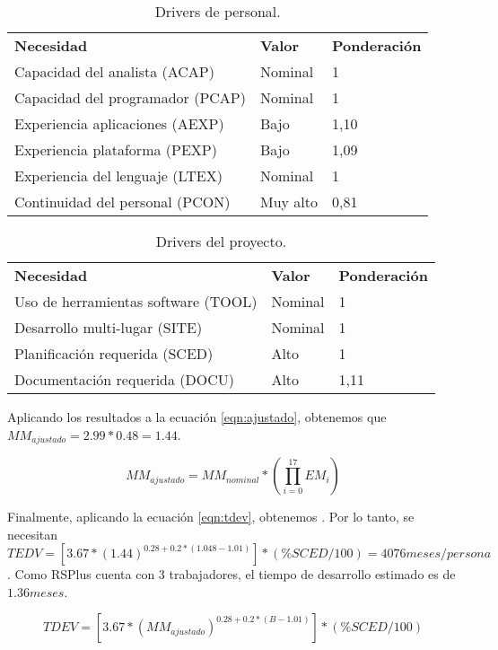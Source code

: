 \begin{table}[h]
\begin{center}
\begin{tabular}{ l l l }
\textbf{Necesidad} & \textbf{Valor} & \textbf{Ponderación} \\
Capacidad del analista (ACAP) &
Nominal &
1 \\
Capacidad del programador (PCAP) &
Nominal &
1 \\
Experiencia aplicaciones (AEXP) &
Bajo &
1,10 \\
Experiencia plataforma (PEXP) &
Bajo &
1,09 \\
Experiencia del lenguaje (LTEX) &
Nominal &
1 \\
Continuidad del personal (PCON) &
Muy alto &
0,81 \\
\end{tabular}
\caption{Drivers de personal.}
\label{tab:personal}
\end{center}
\end{table}

\begin{table}[h]
\begin{center}
\begin{tabular}{ l l l }
\textbf{Necesidad} & \textbf{Valor} & \textbf{Ponderación} \\
Uso de herramientas software (TOOL) &
Nominal &
1 \\
Desarrollo multi-lugar (SITE) &
Nominal &
1 \\
Planificación requerida (SCED) &
Alto &
1 \\
Documentación requerida (DOCU) &
Alto &
1,11 \\
\end{tabular}
\caption{Drivers del proyecto.}
\label{tab:proyecto}
\end{center}
\end{table}

\par Aplicando los resultados a la ecuación \ref{eqn:ajustado}, obtenemos que $MM_{ajustado} = 2.99 * 0.48 =  1.44$.

\begin{equation} \label{eqn:ajustado}MM_{ajustado} = MM_{nominal}*(\prod_{i=0}^{17}EM_{i})\end{equation}


\par Finalmente, aplicando la ecuación \ref{eqn:tdev}, obtenemos $ $. Por lo tanto, se necesitan $TEDV=[3.67*(1.44)^{0.28+0.2*(1.048-1.01)}]*(\%SCED/100)=4076meses/persona$. Como RSPlus cuenta con 3 trabajadores, el tiempo de desarrollo estimado es de $1.36 meses $.

\begin{equation} \label{eqn:tdev}
TDEV = [3.67*(MM_{ajustado})^{0.28+0.2*(B-1.01)}]*(\%SCED/100)
\end{equation}
